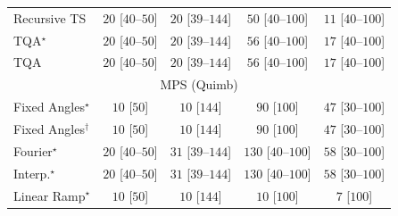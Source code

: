 \begin{tabular}{l|cccc|}
Recursive TS & {\cellcolor[HTML]{F5FBF2}} \color[HTML]{000000} $20$ [$40$--$50$] & {\cellcolor[HTML]{F5FBF2}} \color[HTML]{000000} $20$ [$39$--$144$] & {\cellcolor[HTML]{F0F9EC}} \color[HTML]{000000} $50$ [$40$--$100$] & {\cellcolor[HTML]{F6FCF4}} \color[HTML]{000000} $11$ [$40$--$100$] \\
TQA$^\star$ & {\cellcolor[HTML]{F5FBF2}} \color[HTML]{000000} $20$ [$40$--$50$] & {\cellcolor[HTML]{F5FBF2}} \color[HTML]{000000} $20$ [$39$--$144$] & {\cellcolor[HTML]{EFF9EB}} \color[HTML]{000000} $56$ [$40$--$100$] & {\cellcolor[HTML]{F5FBF3}} \color[HTML]{000000} $17$ [$40$--$100$] \\
TQA & {\cellcolor[HTML]{F5FBF2}} \color[HTML]{000000} $20$ [$40$--$50$] & {\cellcolor[HTML]{F5FBF2}} \color[HTML]{000000} $20$ [$39$--$144$] & {\cellcolor[HTML]{EFF9EB}} \color[HTML]{000000} $56$ [$40$--$100$] & {\cellcolor[HTML]{F5FBF3}} \color[HTML]{000000} $17$ [$40$--$100$] \\
\cline{1-5}
\multicolumn{5}{c}{\rule{0pt}{8pt}MPS (Quimb)} \\
\midrule
Fixed Angles$^\star$ & {\cellcolor[HTML]{F7FCF5}} \color[HTML]{000000} $10$ [$50$] & {\cellcolor[HTML]{F7FCF5}} \color[HTML]{000000} $10$ [$144$] & {\cellcolor[HTML]{E9F7E5}} \color[HTML]{000000} $90$ [$100$] & {\cellcolor[HTML]{F0F9ED}} \color[HTML]{000000} $47$ [$30$--$100$] \\
Fixed Angles$^\dagger$ & {\cellcolor[HTML]{F7FCF5}} \color[HTML]{000000} $10$ [$50$] & {\cellcolor[HTML]{F7FCF5}} \color[HTML]{000000} $10$ [$144$] & {\cellcolor[HTML]{E9F7E5}} \color[HTML]{000000} $90$ [$100$] & {\cellcolor[HTML]{F0F9ED}} \color[HTML]{000000} $47$ [$30$--$100$] \\
Fourier$^\star$ & {\cellcolor[HTML]{F5FBF2}} \color[HTML]{000000} $20$ [$40$--$50$] & {\cellcolor[HTML]{F3FAF0}} \color[HTML]{000000} $31$ [$39$--$144$] & {\cellcolor[HTML]{DFF3DA}} \color[HTML]{000000} $130$ [$40$--$100$] & {\cellcolor[HTML]{EFF9EB}} \color[HTML]{000000} $58$ [$30$--$100$] \\
Interp.$^\star$ & {\cellcolor[HTML]{F5FBF2}} \color[HTML]{000000} $20$ [$40$--$50$] & {\cellcolor[HTML]{F3FAF0}} \color[HTML]{000000} $31$ [$39$--$144$] & {\cellcolor[HTML]{DFF3DA}} \color[HTML]{000000} $130$ [$40$--$100$] & {\cellcolor[HTML]{EFF9EB}} \color[HTML]{000000} $58$ [$30$--$100$] \\
Linear Ramp$^\star$ & {\cellcolor[HTML]{F7FCF5}} \color[HTML]{000000} $10$ [$50$] & {\cellcolor[HTML]{F7FCF5}} \color[HTML]{000000} $10$ [$144$] & {\cellcolor[HTML]{F7FCF5}} \color[HTML]{000000} $10$ [$100$] & {\cellcolor[HTML]{F7FCF5}} \color[HTML]{000000} $7$ [$100$] \\

\end{tabular}
